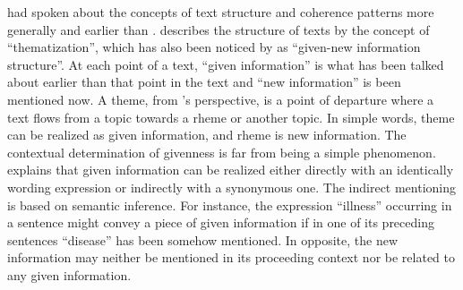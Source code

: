  had spoken about the concepts of text structure and coherence patterns more generally and earlier than . 
 describes the structure of texts by the concept of ``thematization'', which has also been noticed by  as ``given-new information structure''. 
At each point of a text, ``given information'' is what has been talked about earlier than that point in the text and ``new information'' is been mentioned now.  
A theme, from 's perspective, is a point of departure where a text flows from a topic towards a rheme or another topic. 
In simple words, theme can be realized as given information, and rheme is new information. 
The contextual determination of givenness is far from being a simple phenomenon.  
 explains that given information can be realized either directly with an identically wording expression or indirectly with a synonymous one. 
The indirect mentioning is based on semantic inference. 
For instance, the expression ``illness'' occurring in a sentence might convey a piece of given information if in one of its preceding sentences ``disease'' has been somehow mentioned. 
In opposite, the new information may neither be mentioned in its proceeding context nor be related to any given information. 

